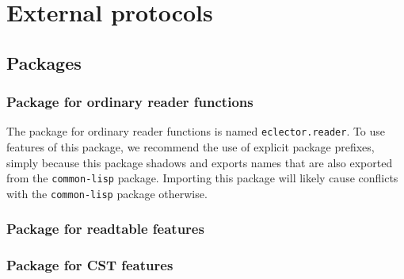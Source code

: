 \chapter{External protocols}

\section{Packages}

\subsection{Package for ordinary reader functions}

The package for ordinary reader functions is named
\texttt{eclector.reader}.  To use features of this package, we
recommend the use of explicit package prefixes, simply because this
package shadows and exports names that are also exported from the
\texttt{common-lisp} package.  Importing this package will likely
cause conflicts with the \texttt{common-lisp} package otherwise.

\subsection{Package for readtable features}

\subsection{Package for CST features}

